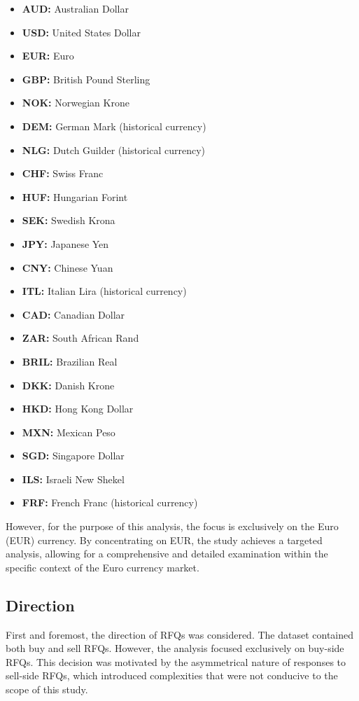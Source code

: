 \begin{itemize}
    \item \textbf{AUD:} Australian Dollar
    \item \textbf{USD:} United States Dollar
    \item \textbf{EUR:} Euro
    \item \textbf{GBP:} British Pound Sterling
    \item \textbf{NOK:} Norwegian Krone
    \item \textbf{DEM:} German Mark (historical currency)
    \item \textbf{NLG:} Dutch Guilder (historical currency)
    \item \textbf{CHF:} Swiss Franc
    \item \textbf{HUF:} Hungarian Forint
    \item \textbf{SEK:} Swedish Krona
    \item \textbf{JPY:} Japanese Yen
    \item \textbf{CNY:} Chinese Yuan
    \item \textbf{ITL:} Italian Lira (historical currency)
    \item \textbf{CAD:} Canadian Dollar
    \item \textbf{ZAR:} South African Rand
    \item \textbf{BRIL:} Brazilian Real
    \item \textbf{DKK:} Danish Krone
    \item \textbf{HKD:} Hong Kong Dollar
    \item \textbf{MXN:} Mexican Peso
    \item \textbf{SGD:} Singapore Dollar
    \item \textbf{ILS:} Israeli New Shekel
    \item \textbf{FRF:} French Franc (historical currency)
\end{itemize}

However, for the purpose of this analysis, the focus is exclusively on the Euro (EUR) currency. By concentrating on EUR, the study achieves a targeted analysis, allowing for a comprehensive and detailed examination within the specific context of the Euro currency market.

\subsection{Direction}
First and foremost, the direction of RFQs was considered. The dataset contained both buy and sell RFQs. However, the analysis focused exclusively on buy-side RFQs. This decision was motivated by the asymmetrical nature of responses to sell-side RFQs, which introduced complexities that were not conducive to the scope of this study.

